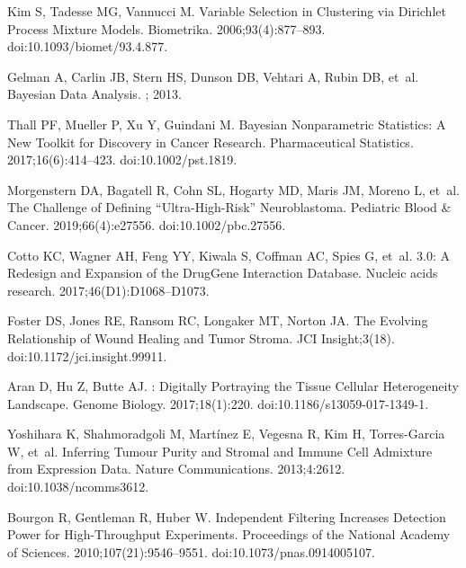 \documentclass[10pt,letterpaper]{article}
\begin{document}
\begin{thebibliography}{10}
	Kim S, Tadesse MG, Vannucci M.
	\newblock Variable Selection in Clustering via {{Dirichlet}} Process Mixture
	Models.
	\newblock Biometrika. 2006;93(4):877--893.
	\newblock doi:{10.1093/biomet/93.4.877}.
	
	Gelman A, Carlin JB, Stern HS, Dunson DB, Vehtari A, Rubin DB, et~al.
	\newblock Bayesian {{Data Analysis}}.
	; 2013.
	
	Thall PF, Mueller P, Xu Y, Guindani M.
	\newblock Bayesian Nonparametric Statistics: {{A}} New Toolkit for Discovery in
	Cancer Research.
	\newblock Pharmaceutical Statistics. 2017;16(6):414--423.
	\newblock doi:{10.1002/pst.1819}.
	
	Morgenstern DA, Bagatell R, Cohn SL, Hogarty MD, Maris JM, Moreno L, et~al.
	\newblock The Challenge of Defining ``Ultra-High-Risk'' Neuroblastoma.
	\newblock Pediatric Blood \& Cancer. 2019;66(4):e27556.
	\newblock doi:{10.1002/pbc.27556}.
	
	Cotto KC, Wagner AH, Feng YY, Kiwala S, Coffman AC, Spies G, et~al.
	 3.0: A Redesign and Expansion of the Drug\textendash{}Gene
	Interaction Database.
	\newblock Nucleic acids research. 2017;46(D1):D1068--D1073.
	
	Foster DS, Jones RE, Ransom RC, Longaker MT, Norton JA.
	\newblock The Evolving Relationship of Wound Healing and Tumor Stroma.
	\newblock JCI Insight;3(18).
	\newblock doi:{10.1172/jci.insight.99911}.
	
	Aran D, Hu Z, Butte AJ.
	: Digitally Portraying the Tissue Cellular Heterogeneity
	Landscape.
	\newblock Genome Biology. 2017;18(1):220.
	\newblock doi:{10.1186/s13059-017-1349-1}.
	
	Yoshihara K, Shahmoradgoli M, Mart{\'i}nez E, Vegesna R, Kim H, {Torres-Garcia}
	W, et~al.
	\newblock Inferring Tumour Purity and Stromal and Immune Cell Admixture from
	Expression Data.
	\newblock Nature Communications. 2013;4:2612.
	\newblock doi:{10.1038/ncomms3612}.
	
	Bourgon R, Gentleman R, Huber W.
	\newblock Independent Filtering Increases Detection Power for High-Throughput
	Experiments.
	\newblock Proceedings of the National Academy of Sciences.
	2010;107(21):9546--9551.
	\newblock doi:{10.1073/pnas.0914005107}.
	

\end{thebibliography}
\end{document}
